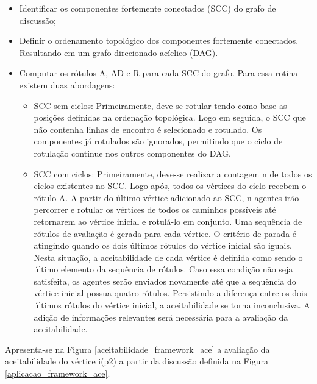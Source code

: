 \begin{itemize}

\item Identificar os componentes fortemente conectados (SCC) do grafo de discussão;

\item Definir o ordenamento topológico dos componentes fortemente conectados. Resultando em um grafo direcionado acíclico (DAG).

\item Computar os rótulos A, AD e R para cada SCC do grafo. Para essa rotina existem duas abordagens:

\begin{itemize}
\item SCC sem ciclos: Primeiramente, deve-se rotular tendo como base as posições definidas na ordenação topológica. Logo em seguida, o SCC que não contenha linhas de encontro é selecionado e rotulado. Os componentes já rotulados são ignorados, permitindo que o ciclo de rotulação continue nos outros componentes do DAG.

\item SCC com ciclos: Primeiramente, deve-se realizar a contagem n de  todos os ciclos existentes no SCC. Logo após, todos os vértices do ciclo recebem o rótulo A. A partir do último vértice adicionado ao SCC, n agentes irão percorrer e rotular os vértices de todos os caminhos possíveis até retornarem ao vértice inicial e rotulá-lo em conjunto. Uma sequência de rótulos de avaliação é gerada para cada vértice.  O critério de parada é atingindo quando os dois últimos rótulos do vértice inicial são iguais. Nesta situação, a aceitabilidade de cada vértice é definida como sendo o último elemento da sequência de rótulos. Caso essa condição não seja satisfeita, os agentes serão enviados novamente até que a sequência do vértice inicial possua quatro rótulos. Persistindo a diferença entre os dois últimos rótulos do vértice inicial, a aceitabilidade se torna inconclusiva. A adição de informações relevantes será necessária para a avaliação da aceitabilidade. 

\end{itemize}
\end{itemize}	
	
Apresenta-se na Figura \ref{aceitabilidade_framework_ace} a avaliação da aceitabilidade do vértice i(p2) a partir da discussão definida na Figura \ref{aplicacao_framework_ace}.

